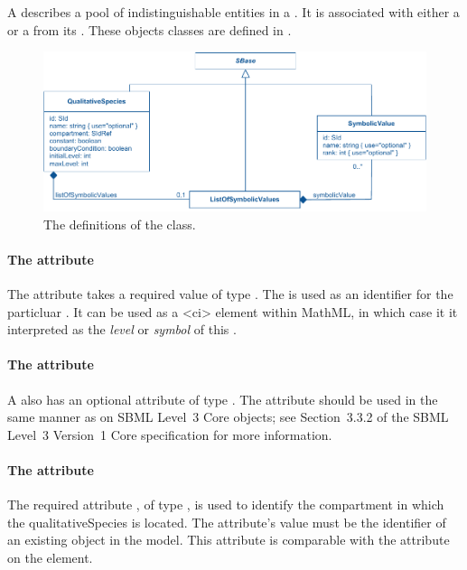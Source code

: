 A \QualitativeSpecies describes a pool of indistinguishable entities in a . It is associated with either a  or a  from its \ListOfSymbolicValues. These objects classes are defined in .

\begin{figure}
  \includegraphics{figs/qual-qualitative-species-uml.pdf}
  \caption{The definitions of the \QualitativeSpecies class. }
  \label{qual-qualitative-species-uml}
\end{figure}

\paragraph{The \fixttspace{} attribute}

The  attribute takes a required value
of type . The  is used as an identifier for the particluar \QualitativeSpecies. It can be used as a 
<ci> element within MathML, in which case it it interpreted as the \emph{level} or \emph{symbol} of this \QualitativeSpecies.

\paragraph{The \fixttspace{} attribute}

A \QualitativeSpecies also has an optional  attribute of type . 
 The  attribute should be used
in the same manner as on SBML Level~3 Core
objects; see Section~3.3.2 of the SBML Level~3 Version~1 Core
specification for more information.


\paragraph{The  attribute}
The required attribute , of type , is used to identify the compartment in which the qualitativeSpecies is located.  The attribute's value must be the identifier of an existing  object in the model.  This attribute is comparable with the  attribute on the  element.

